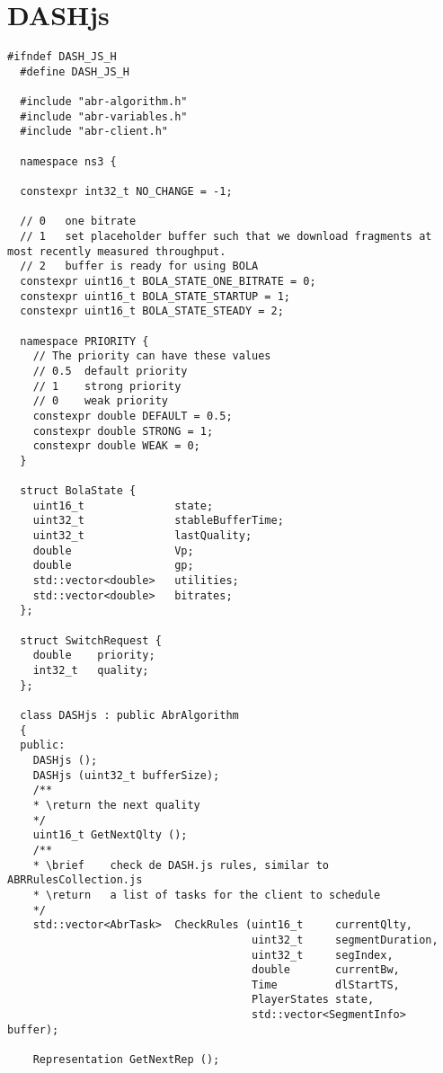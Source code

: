 \section{DASHjs}
\label{sec:dashjs}
\begin{lstlisting}[language=myC++, caption={DASHjs.h}, captionpos=b]
  #ifndef DASH_JS_H
  #define DASH_JS_H
  
  #include "abr-algorithm.h"
  #include "abr-variables.h"
  #include "abr-client.h"
  
  namespace ns3 {
  
  constexpr int32_t NO_CHANGE = -1;
  
  // 0   one bitrate
  // 1   set placeholder buffer such that we download fragments at most recently measured throughput.
  // 2   buffer is ready for using BOLA
  constexpr uint16_t BOLA_STATE_ONE_BITRATE = 0;
  constexpr uint16_t BOLA_STATE_STARTUP = 1;
  constexpr uint16_t BOLA_STATE_STEADY = 2;
  
  namespace PRIORITY {
    // The priority can have these values
    // 0.5  default priority
    // 1    strong priority
    // 0    weak priority
    constexpr double DEFAULT = 0.5;
    constexpr double STRONG = 1;
    constexpr double WEAK = 0;
  }
  
  struct BolaState {
    uint16_t              state;
    uint32_t              stableBufferTime;
    uint32_t              lastQuality;
    double                Vp;
    double                gp;
    std::vector<double>   utilities;
    std::vector<double>   bitrates;
  };
  
  struct SwitchRequest {
    double    priority;
    int32_t   quality;
  };
  
  class DASHjs : public AbrAlgorithm
  {
  public:
    DASHjs ();
    DASHjs (uint32_t bufferSize);
    /**
    * \return the next quality
    */
    uint16_t GetNextQlty ();
    /**
    * \brief    check de DASH.js rules, similar to ABRRulesCollection.js
    * \return   a list of tasks for the client to schedule
    */
    std::vector<AbrTask>  CheckRules (uint16_t     currentQlty,
                                      uint32_t     segmentDuration,
                                      uint32_t     segIndex,
                                      double       currentBw,
                                      Time         dlStartTS,
                                      PlayerStates state,
                                      std::vector<SegmentInfo> buffer);
  
    Representation GetNextRep ();
  

\end{lstlisting}
